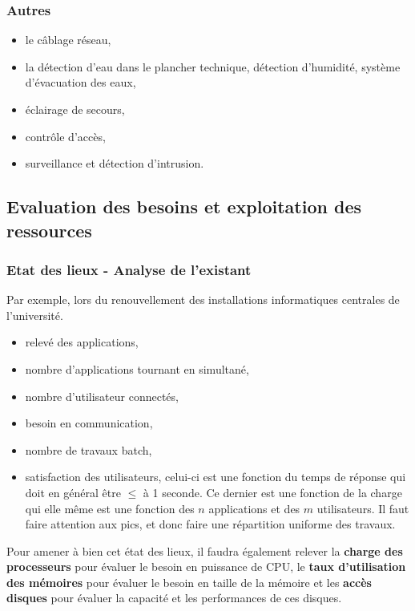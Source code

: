 \documentclass[10pt,a4paper,oneside,titlepage]{report}
\newcommand{\titre}[1]{\textcolor{title}{#1}}
\newcommand{\strong}[1]{\textbf{\titre{#1}}}
\begin{document}
\subsubsection{Autres}

\begin{itemize}
\item le c\^ablage réseau,
\item la détection d'eau dans le plancher technique, détection d'humidité, système d'évacuation des eaux,
\item éclairage de secours,
\item contr\^ole d'accès,
\item surveillance et détection d'intrusion.
\end{itemize}

\subsection{Evaluation des besoins et exploitation des ressources}

\subsubsection{Etat des lieux - Analyse de l'existant}

Par exemple, lors du renouvellement des installations informatiques centrales de l'université.
\begin{itemize}
\item relevé des applications,
\item nombre d'applications tournant en simultané,
\item nombre d'utilisateur connectés,
\item besoin en communication,
\item nombre de travaux batch,
\item satisfaction des utilisateurs, celui-ci est une fonction du temps de réponse qui doit en général \^etre $\leq$ à 1 seconde. Ce dernier est une fonction de la charge qui elle m\^eme est une fonction des $n$ applications et des $m$ utilisateurs. Il faut faire attention aux pics, et donc faire une répartition uniforme des travaux.
\end{itemize}

Pour amener à bien cet état des lieux, il faudra également relever la \strong{charge des processeurs} pour évaluer le besoin en puissance de CPU, le \strong{taux d'utilisation des mémoires} pour évaluer le besoin en taille de la mémoire et les
\strong{accès disques} pour évaluer la capacité et les performances de ces disques.
\end{document}
